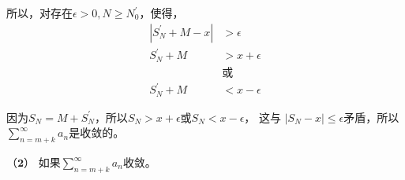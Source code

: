 \documentclass{article}
\theoremstyle{mystyle}
\begin{document}
所以，对存在$\epsilon > 0, N \geq N_0^\prime$，使得，
\begin{align*}
  |S_N^\prime + M - x| & > \epsilon     \\
  S_N^\prime + M       & > x + \epsilon \\
                       & \textbf{或}     \\
  S_N^\prime + M       & < x - \epsilon
\end{align*}

因为$S_N = M + S_N^\prime$，所以$S_N > x + \epsilon$或$S_N < x - \epsilon$，
这与 $|S_N - x| \leq \epsilon$矛盾，所以$\sum \limits_{n=m+k} ^{\infty} a_n$是收敛的。

$\textbf{（2）}$ 如果$\sum \limits_{n=m+k} ^{\infty} a_n$收敛。
\end{document}
